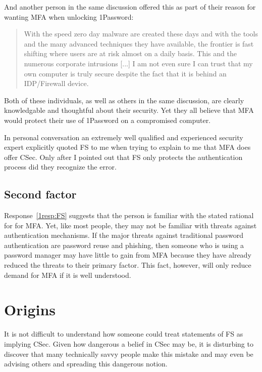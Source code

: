 \documentclass[12pt]{article}
\newcommand{\prop}[1]{\textsf{#1}}
\begin{document}
And another person in the same discussion offered this as part of their reason
for wanting MFA when unlocking 1Password:

\begin{quotation}
  With the speed zero day malware are created these days and with the tools and the many advanced techniques they have available, the frontier is fast shifting where users are at risk almost on a daily basis. This and the numerous corporate intrusions [...] I am not even sure I can trust that my own computer is truly secure despite the fact that it is behind an IDP/Firewall device.
\end{quotation}

Both of these individuals, as well as others in the same discussion,
are clearly knowledgable and thoughtful about their security.
Yet they all believe that MFA would protect their use of 1Password on a compromised computer.

In personal conversation an extremely well qualified and experienced security expert explicitly quoted \prop{FS} to me when trying to explain to me that MFA does offer \prop{CSec}. Only after I pointed out that  \prop{FS} only protects the authentication process did they recognize the error.

\subsection{Second factor}

Response~\ref{1resp:FS} suggests that the person is familiar with the stated rational for for MFA\@.
Yet, like most people, they may not be familiar with threats against authentication mechanisms.
If the major threats against traditional password authentication are password reuse and phishing,
then someone who is using a password manager may have little to gain from
MFA because they have already reduced the threats to their primary factor.
This fact, however, will only reduce demand for MFA if it is well understood.

\section{Origins}

It is not difficult to understand how someone could treat statements of  \prop{FS} as implying  \prop{CSec}.
Given how dangerous a belief in \prop{CSec} may be, it is disturbing to discover that
many technically savvy people make this mistake and may even be advising others and spreading this dangerous notion.
\end{document}
